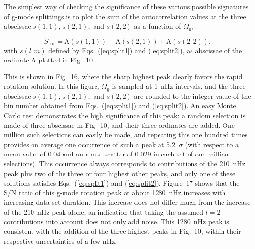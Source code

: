 \documentclass[bibyear]{aa}
\begin{document}
The simplest way of checking the significance of these various possible signatures of g-mode splittings is to plot the sum of the autocorrelation values at the three abscissae $s(1,1)$, $s(2,1),$ and $s(2,2)$ as a function of  $\Omega_\mathrm{g}$, 

\begin{equation}\label{eq:Scor}
S_\mathrm{cor} = \mathrm{A}(s(1,1))+\mathrm{A}(s(2,1))+\mathrm{A}(s(2,2))
,\end{equation}
with $s(l,m)$ defined by Eqs.~(\ref{eq:split1}) and (\ref{eq:split2}), as abscissae of the ordinate A plotted in Fig.~10.

This is shown in Fig.~16, where the sharp highest peak clearly favors the rapid rotation solution. In this figure,  $\Omega_\mathrm{g}$ is sampled at 1~nHz intervals, and the three abscissae $s(1,1)$, $s(2,1),$ and $s(2,2)$ are rounded to the integer value of the bin number obtained from Eqs.~(\ref{eq:split1}) and (\ref{eq:split2}). An easy Monte Carlo test demonstrates the high significance of this peak: a random selection is made of three abscissae in Fig.~10, and their three ordinates are added. One million such selections can easily be made, and repeating this one hundred times provides on average one occurrence of such a peak at  5.2~$\sigma$ (with respect to a mean value of 0.04 and an r.m.s. scatter of 0.029 in each set of one million selections).  This occurrence always corresponds to contributions of the 210~nHz peak plus two of the  three or four highest other peaks, and only one of these solutions satisfies Eqs.~(\ref{eq:split1}) and (\ref{eq:split2}). Figure~17 shows that the S/N ratio of this g-mode rotation peak at about 1280~nHz increases with increasing data set duration. This increase does not differ much from the increase of the 210~nHz peak alone, an indication that taking the assumed $l=2$ contributions
into account does not only add noise.  This 1280~nHz peak is consistent with the addition of the three highest peaks in Fig.~10, within their respective uncertainties of a few nHz. 
\end{document}
